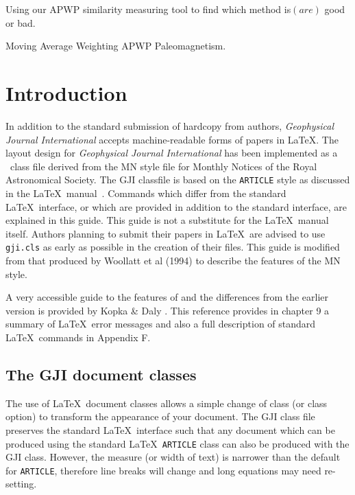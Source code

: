 \begin{summary}
  Using our APWP similarity measuring tool to find which method is$(are)$ good
  or bad.
\end{summary}

\begin{keywords}
  Moving Average \textendash{} Weighting \textendash{} APWP \textendash{}
  Paleomagnetism.
\end{keywords}

\section{Introduction}

In addition to the standard submission of hardcopy from authors,
\textit{Geophysical Journal International} accepts machine-readable forms of
papers in \LaTeX. The layout design for \textit{Geophysical Journal
International} has been implemented as a \LaTeXe\ class file derived from the MN
style file for Monthly Notices of the Royal Astronomical Society. The GJI
classfile is based on the \verb"ARTICLE" style as discussed in the \LaTeX\
manual~\cite{la}. Commands which differ from the standard \LaTeX\ interface, or
which are provided in addition to the standard interface, are explained in this
guide. This guide is not a substitute for the \LaTeX\ manual itself. Authors
planning to submit their papers in \LaTeX\ are advised to use \verb"gji.cls" as
early as possible in the creation of their files. This guide is modified from
that produced by Woollatt et al (1994) to describe the features of the MN style.

A very accessible guide to the features of \LaTeXe{} and the differences
from the earlier version is provided by Kopka \& Daly \shortcite{kd}.  This
reference provides in chapter 9 a summary of \LaTeX\ error messages and also
a full description of standard \LaTeX\ commands in Appendix F.


\subsection{The GJI document classes}

The use of \LaTeX\ document classes allows a simple change of class
(or class option) to transform the appearance of your document. The
GJI class file preserves the standard \LaTeX\ interface such that any
document which can be produced using the standard \LaTeX\ \verb"ARTICLE"
class can also be produced with the GJI class. However, the measure (or
width of text) is narrower than the default for \verb"ARTICLE", therefore
line breaks will change and long equations may need re-setting.


